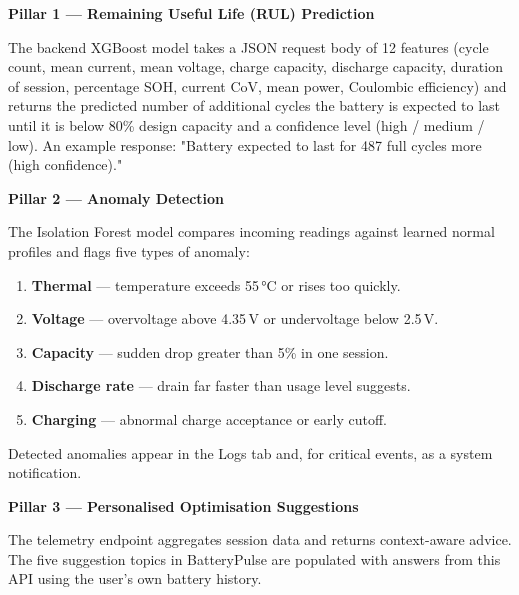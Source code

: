 \documentclass[12pt,a4paper]{report}
\begin{document}
\textbf{Pillar 1 — Remaining Useful Life (RUL) Prediction}

The backend XGBoost model takes a JSON request body of 12 features (cycle count, mean current, mean voltage, charge capacity, discharge capacity, duration of session, percentage SOH, current CoV, mean power, Coulombic efficiency) and returns the predicted number of additional cycles the battery is expected to last until it is below 80\% design capacity and a confidence level (high / medium / low). An example response: "Battery expected to last for 487 full cycles more (high confidence)."

\textbf{Pillar 2 — Anomaly Detection}

The Isolation Forest model compares incoming readings against learned normal
profiles and flags five types of anomaly:
\begin{enumerate}[leftmargin=1.5em]
  \item \textbf{Thermal} — temperature exceeds 55\,°C or rises too quickly.
  \item \textbf{Voltage} — overvoltage above 4.35\,V or undervoltage below 2.5\,V.
  \item \textbf{Capacity} — sudden drop greater than 5\% in one session.
  \item \textbf{Discharge rate} — drain far faster than usage level suggests.
  \item \textbf{Charging} — abnormal charge acceptance or early cutoff.
\end{enumerate}
Detected anomalies appear in the Logs tab and, for critical events, as a system
notification.

\textbf{Pillar 3 — Personalised Optimisation Suggestions}

The telemetry endpoint aggregates session data and returns context-aware advice.
The five suggestion topics in BatteryPulse are populated with answers from this API
using the user's own battery history.
\end{document}
